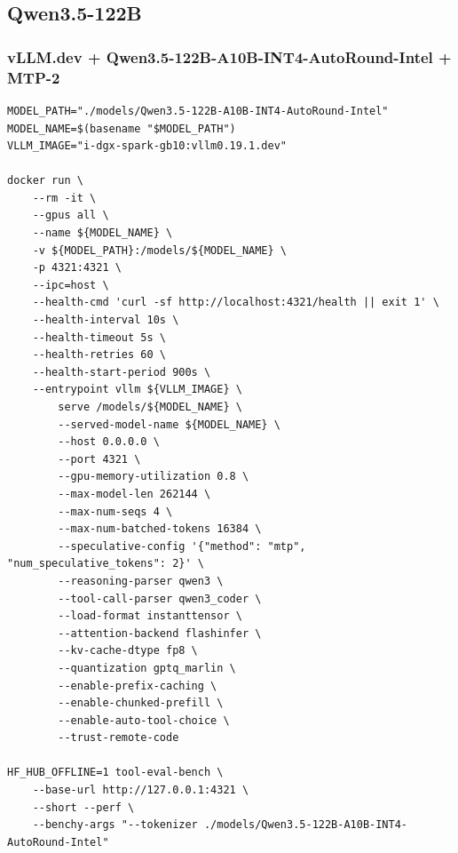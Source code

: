 \documentclass{article}
\begin{document}
\subsection{Qwen3.5-122B}
\subsubsection{vLLM.dev + Qwen3.5-122B-A10B-INT4-AutoRound-Intel + MTP-2}
\begin{lstlisting}
MODEL_PATH="./models/Qwen3.5-122B-A10B-INT4-AutoRound-Intel"
MODEL_NAME=$(basename "$MODEL_PATH")
VLLM_IMAGE="i-dgx-spark-gb10:vllm0.19.1.dev"

docker run \
    --rm -it \
    --gpus all \
    --name ${MODEL_NAME} \
    -v ${MODEL_PATH}:/models/${MODEL_NAME} \
    -p 4321:4321 \
    --ipc=host \
    --health-cmd 'curl -sf http://localhost:4321/health || exit 1' \
    --health-interval 10s \
    --health-timeout 5s \
    --health-retries 60 \
    --health-start-period 900s \
    --entrypoint vllm ${VLLM_IMAGE} \
        serve /models/${MODEL_NAME} \
        --served-model-name ${MODEL_NAME} \
        --host 0.0.0.0 \
        --port 4321 \
        --gpu-memory-utilization 0.8 \
        --max-model-len 262144 \
        --max-num-seqs 4 \
        --max-num-batched-tokens 16384 \
        --speculative-config '{"method": "mtp", "num_speculative_tokens": 2}' \
        --reasoning-parser qwen3 \
        --tool-call-parser qwen3_coder \
        --load-format instanttensor \
        --attention-backend flashinfer \
        --kv-cache-dtype fp8 \
        --quantization gptq_marlin \
        --enable-prefix-caching \
        --enable-chunked-prefill \
        --enable-auto-tool-choice \
        --trust-remote-code

HF_HUB_OFFLINE=1 tool-eval-bench \
    --base-url http://127.0.0.1:4321 \
    --short --perf \
    --benchy-args "--tokenizer ./models/Qwen3.5-122B-A10B-INT4-AutoRound-Intel"
\end{lstlisting}
\end{document}
